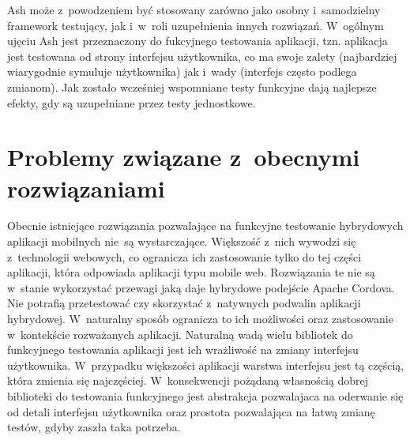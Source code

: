 \documentclass[brudnopis]{xmgr}
\begin{document}
Ash może z~powodzeniem być stosowany zarówno jako osobny i~samodzielny framework testujący, jak i~w~roli uzupełnienia innych rozwiązań. W~ogólnym ujęciu Ash jest przeznaczony do fukcyjnego testowania aplikacji, tzn. aplikacja jest testowana od strony interfejsu użytkownika, co ma swoje zalety (najbardziej wiarygodnie symuluje użytkownika) jak i~wady (interfejs często podlega zmianom). Jak zostało wcześniej wspomniane testy funkcyjne dają najlepsze efekty, gdy są uzupełniane przez testy jednostkowe.  

\section{Problemy związane z~obecnymi rozwiązaniami}

Obecnie istniejące rozwiązania pozwalające na funkcyjne testowanie hybrydowych aplikacji mobilnych nie~są wystarczające. Większość z~nich wywodzi się z~technologii webowych, co ogranicza ich zastosowanie tylko do tej części aplikacji, która odpowiada aplikacji typu mobile web. Rozwiązania te nie są w~stanie wykorzystać przewagi jaką daje hybrydowe podejście Apache Cordova. Nie potrafią przetestować czy skorzystać z~natywnych podwalin aplikacji hybrydowej. W~naturalny sposób ogranicza to ich możliwości oraz zastosowanie w~kontekście rozważanych aplikacji. Naturalną wadą wielu bibliotek do funkcyjnego testowania aplikacji jest ich wrażliwość na zmiany interfejsu użytkownika. W~przypadku większości aplikacji warstwa interfejsu jest tą częścią, która zmienia się najczęściej. W~konsekwencji pożądaną własnością dobrej biblioteki do testowania funkcyjnego jest abstrakcja pozwalajaca na oderwanie się od detali interfejsu użytkownika oraz prostota pozwalająca na łatwą zmianę testów, gdyby zaszła taka potrzeba. 
\end{document}
